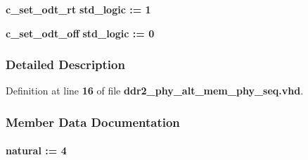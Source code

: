 \begin{DoxyCompactItemize}
\item 
{\bf c\+\_\+set\+\_\+odt\+\_\+rt} {\bfseries \textcolor{comment}{std\+\_\+logic}\textcolor{vhdlchar}{ }\textcolor{vhdlchar}{ }\textcolor{vhdlchar}{\+:}\textcolor{vhdlchar}{=}\textcolor{vhdlchar}{ }\textcolor{vhdlchar}{ }\textcolor{vhdlchar}{\textquotesingle{}}\textcolor{vhdlchar}{ } \textcolor{vhdldigit}{1} \textcolor{vhdlchar}{ }\textcolor{vhdlchar}{\textquotesingle{}}\textcolor{vhdlchar}{ }} 
\item 
{\bf c\+\_\+set\+\_\+odt\+\_\+off} {\bfseries \textcolor{comment}{std\+\_\+logic}\textcolor{vhdlchar}{ }\textcolor{vhdlchar}{ }\textcolor{vhdlchar}{\+:}\textcolor{vhdlchar}{=}\textcolor{vhdlchar}{ }\textcolor{vhdlchar}{ }\textcolor{vhdlchar}{\textquotesingle{}}\textcolor{vhdlchar}{ } \textcolor{vhdldigit}{0} \textcolor{vhdlchar}{ }\textcolor{vhdlchar}{\textquotesingle{}}\textcolor{vhdlchar}{ }} 
\end{DoxyCompactItemize}


\subsubsection{Detailed Description}


Definition at line {\bf 16} of file {\bf ddr2\+\_\+phy\+\_\+alt\+\_\+mem\+\_\+phy\+\_\+seq.\+vhd}.



\subsubsection{Member Data Documentation}
\paragraph[{c\+\_\+cal\+\_\+burst\+\_\+len}]{ {\bfseries \textcolor{comment}{natural}\textcolor{vhdlchar}{ }\textcolor{vhdlchar}{ }\textcolor{vhdlchar}{\+:}\textcolor{vhdlchar}{=}\textcolor{vhdlchar}{ }\textcolor{vhdlchar}{ } \textcolor{vhdldigit}{4} \textcolor{vhdlchar}{ }} \hspace{0.3cm}{\ttfamily [Constant]}}\label{classddr2__phy__alt__mem__phy__constants__pkg_a5e9af3d3d0608a37a08979fb9c40fa4f}


